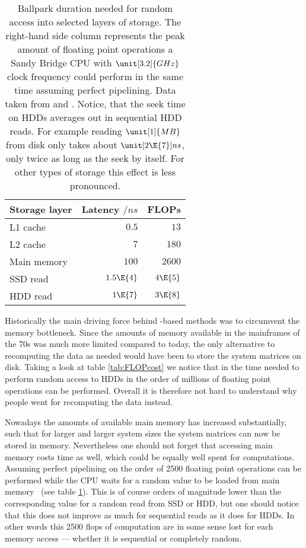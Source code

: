\begin{table}
	\centering
	\begin{tabular}{lrr}
		\toprule
		Storage layer  & Latency $/\unit{ns}$ & FLOPs \\
		\midrule
		L1 cache       & $0.5$                &  $13$  \\
		L2 cache       & $7$                  &  $180$ \\
		Main memory    & $100$                &  $2600$ \\
		SSD read       & $1.5\E{4}$           &  $4\E{5}$ \\
		HDD read       & $1\E{7}$             &  $3\E{8}$ \\
		\bottomrule
	\end{tabular}
	\caption[Duration needed for random access into storage]{
		Ballpark duration needed for random access into selected
		layers of storage.
		The right-hand side column represents the peak amount
		of floating point operations a Sandy Bridge CPU with $\unit[3.2]{GHz}$
		clock frequency could perform in the same time
		assuming perfect pipelining.
		Data taken from \cite{CpuData} and \cite{LatencyWeb}.
		Notice, that the seek time on HDDs averages out
		in sequential HDD reads.
		For example reading $\unit[1]{MB}$ from disk only takes about $\unit[2\E{7}]{ns}$,
		\ie only twice as long as the seek by itself.
		For other types of storage this effect is less pronounced.
	}
	\label{tab:FLOPcost}
\end{table}

Historically the main driving force behind \contraction-based
methods was to circumvent the memory bottleneck.
Since the amounts of memory available in the mainframes of the 70s
was much more limited compared to today,
the only alternative to recomputing the data as needed
would have been to store the system matrices on disk.
Taking a look at table \vref{tab:FLOPcost}
we notice that in the time needed to perform random access to HDDs
in the order of millions of floating point operations can be performed.
Overall it is therefore not hard to understand why
people went for recomputing the data instead.

Nowadays the amounts of available main memory has increased substantially,
such that for larger and larger system sizes
the system matrices can now be stored in memory.
Nevertheless one should not forget that accessing main memory costs time as well,
which could be equally well spent for computations.
Assuming perfect pipelining
on the order of 2500 floating point operations can be performed
while the CPU waits for a random value to be loaded from main memory%
~(see table \ref{tab:FLOPcost}).
This is of course orders of magnitude lower than the corresponding
value for a random read from SSD or HDD,
but one should notice that this does not improve as much for sequential
reads as it does for HDDs.
In other words this 2500 flops of computation are
in some sense lost for each memory access
--- whether it is sequential or completely random.


